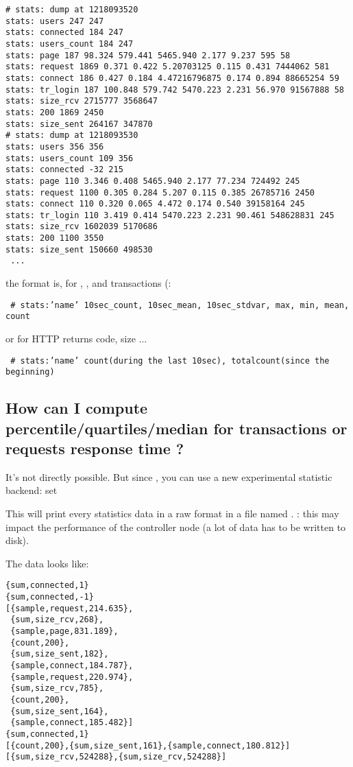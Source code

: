 \documentclass{TSUNG-en}
\begin{document}
\begin{appendix}
\begin{Verbatim}
# stats: dump at 1218093520
stats: users 247 247
stats: connected 184 247
stats: users_count 184 247
stats: page 187 98.324 579.441 5465.940 2.177 9.237 595 58
stats: request 1869 0.371 0.422 5.20703125 0.115 0.431 7444062 581
stats: connect 186 0.427 0.184 4.47216796875 0.174 0.894 88665254 59
stats: tr_login 187 100.848 579.742 5470.223 2.231 56.970 91567888 58
stats: size_rcv 2715777 3568647
stats: 200 1869 2450
stats: size_sent 264167 347870
# stats: dump at 1218093530
stats: users 356 356
stats: users_count 109 356
stats: connected -32 215
stats: page 110 3.346 0.408 5465.940 2.177 77.234 724492 245
stats: request 1100 0.305 0.284 5.207 0.115 0.385 26785716 2450
stats: connect 110 0.320 0.065 4.472 0.174 0.540 39158164 245
stats: tr_login 110 3.419 0.414 5470.223 2.231 90.461 548628831 245
stats: size_rcv 1602039 5170686
stats: 200 1100 3550
stats: size_sent 150660 498530
 ...
\end{Verbatim}

 the format is, for , ,
  and transactions (:

 \texttt{ \# stats:'name' 10sec\_count, 10sec\_mean, 10sec\_stdvar,
   max, min, mean, count}

 or for HTTP returns code, size ...

\texttt{ \# stats:'name' count(during the last 10sec), totalcount(since the beginning)}

\subsection{How can I compute percentile/quartiles/median for transactions or requests
  response time ?}

It's not directly possible. But since , you can
use a new experimental statistic backend: set 

This will print every statistics data in a raw format in a file named
. : this may impact the performance of
the controller node (a lot of data has to be written to disk).

The data looks like:
\begin{Verbatim}
{sum,connected,1}
{sum,connected,-1}
[{sample,request,214.635},
 {sum,size_rcv,268},
 {sample,page,831.189},
 {count,200},
 {sum,size_sent,182},
 {sample,connect,184.787},
 {sample,request,220.974},
 {sum,size_rcv,785},
 {count,200},
 {sum,size_sent,164},
 {sample,connect,185.482}]
{sum,connected,1}
[{count,200},{sum,size_sent,161},{sample,connect,180.812}]
[{sum,size_rcv,524288},{sum,size_rcv,524288}]
\end{Verbatim}


\end{appendix}
\end{document}
